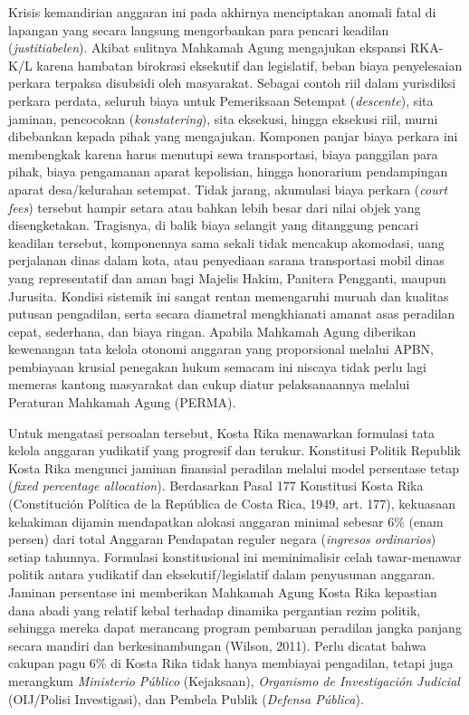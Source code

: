 \documentclass[12pt, a4paper]{article}
\begin{document}
Krisis kemandirian anggaran ini pada akhirnya menciptakan anomali fatal di lapangan yang secara langsung mengorbankan para pencari keadilan (\textit{justitiabelen}). Akibat sulitnya Mahkamah Agung mengajukan ekspansi RKA-K/L karena hambatan birokrasi eksekutif dan legislatif, beban biaya penyelesaian perkara terpaksa disubsidi oleh masyarakat. Sebagai contoh riil dalam yurisdiksi perkara perdata, seluruh biaya untuk Pemeriksaan Setempat (\textit{descente}), sita jaminan, pencocokan (\textit{konstatering}), sita eksekusi, hingga eksekusi riil, murni dibebankan kepada pihak yang mengajukan. Komponen panjar biaya perkara ini membengkak karena harus menutupi sewa transportasi, biaya panggilan para pihak, biaya pengamanan aparat kepolisian, hingga honorarium pendampingan aparat desa/kelurahan setempat. Tidak jarang, akumulasi biaya perkara (\textit{court fees}) tersebut hampir setara atau bahkan lebih besar dari nilai objek yang disengketakan. Tragisnya, di balik biaya selangit yang ditanggung pencari keadilan tersebut, komponennya sama sekali tidak mencakup akomodasi, uang perjalanan dinas dalam kota, atau penyediaan sarana transportasi mobil dinas yang representatif dan aman bagi Majelis Hakim, Panitera Pengganti, maupun Jurusita. Kondisi sistemik ini sangat rentan memengaruhi muruah dan kualitas putusan pengadilan, serta secara diametral mengkhianati amanat asas peradilan cepat, sederhana, dan biaya ringan. Apabila Mahkamah Agung diberikan kewenangan tata kelola otonomi anggaran yang proporsional melalui APBN, pembiayaan krusial penegakan hukum semacam ini niscaya tidak perlu lagi memeras kantong masyarakat dan cukup diatur pelaksanaannya melalui Peraturan Mahkamah Agung (PERMA).

Untuk mengatasi persoalan tersebut, Kosta Rika menawarkan formulasi tata kelola anggaran yudikatif yang progresif dan terukur. Konstitusi Politik Republik Kosta Rika mengunci jaminan finansial peradilan melalui model persentase tetap (\textit{fixed percentage allocation}). Berdasarkan Pasal 177 Konstitusi Kosta Rika (Constitución Política de la República de Costa Rica, 1949, art. 177), kekuasaan kehakiman dijamin mendapatkan alokasi anggaran minimal sebesar 6\% (enam persen) dari total Anggaran Pendapatan reguler negara (\textit{ingresos ordinarios}) setiap tahunnya. Formulasi konstitusional ini meminimalisir celah tawar-menawar politik antara yudikatif dan eksekutif/legislatif dalam penyusunan anggaran. Jaminan persentase ini memberikan Mahkamah Agung Kosta Rika kepastian dana abadi yang relatif kebal terhadap dinamika pergantian rezim politik, sehingga mereka dapat merancang program pembaruan peradilan jangka panjang secara mandiri dan berkesinambungan (Wilson, 2011). Perlu dicatat bahwa cakupan pagu 6\% di Kosta Rika tidak hanya membiayai pengadilan, tetapi juga merangkum \textit{Ministerio Público} (Kejaksaan), \textit{Organismo de Investigación Judicial} (OIJ/Polisi Investigasi), dan Pembela Publik (\textit{Defensa Pública}).
\end{document}
